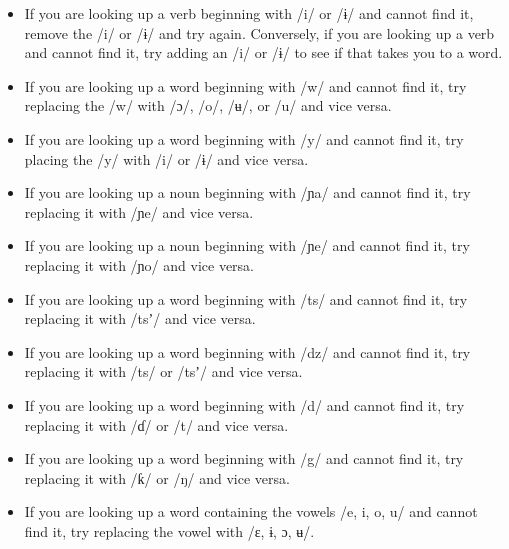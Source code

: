 \begin{itemize}
\item 
If you are looking up a verb beginning with /i/ or /ɨ/ and cannot find it, remove the /i/ or /ɨ/ and try again. Conversely, if you are looking up a verb and cannot find it, try adding an /i/ or /ɨ/ to see if that takes you to a word.
\item 
If you are looking up a word beginning with /w/ and cannot find it, try replacing the /w/ with /ɔ/, /o/, /ʉ/, or /u/ and vice versa.
\item
If you are looking up a word beginning with /y/ and cannot find it, try placing the /y/ with /i/ or /ɨ/ and vice versa. 
\item 
If you are looking up a noun beginning with /ɲa/ and cannot find it, try replacing it with /ɲe/ and vice versa. 
\item 
If you are looking up a noun beginning with /ɲe/ and cannot find it, try replacing it with /ɲo/ and vice versa. 
\item 
If you are looking up a word beginning with /ts/ and cannot find it, try replacing it with /tsʼ/ and vice versa. 
\item 
If you are looking up a word beginning with /dz/ and cannot find it, try replacing it with /ts/ or /tsʼ/ and vice versa. 
\item 
If you are looking up a word beginning with /d/ and cannot find it, try replacing it with /ɗ/ or /t/ and vice versa. 
\item 
If you are looking up a word beginning with /g/ and cannot find it, try replacing it with /ƙ/ or /ŋ/ and vice versa. 
\item 
If you are looking up a word containing the vowels /e, i, o, u/ and cannot find it, try replacing the vowel with /ɛ, ɨ, ɔ, ʉ/.
\end{itemize}
 
